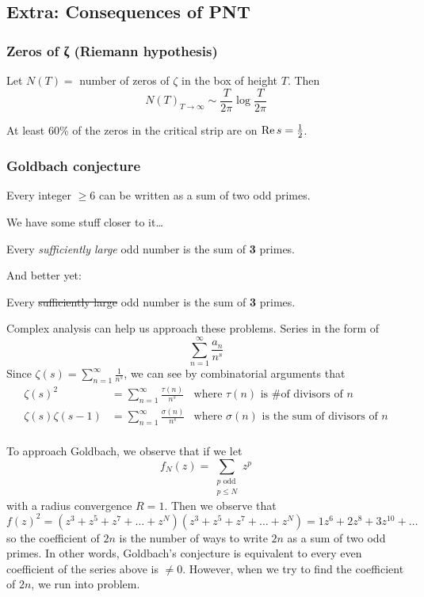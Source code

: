 \documentclass[12pt]{article}
\begin{document}
\subsection{Extra: Consequences of PNT}
\subsubsection{Zeros of ζ (Riemann hypothesis)}
\begin{theorem}
    Let $N(T) = $ number of zeros of $\zeta$ in the box of height $T$. Then \[N(T)_{T\to \infty}\sim \frac{T}{2\pi}\log \frac{T}{2\pi}\]
\end{theorem}
\rmk[Lagaria's] At least 60\% of the zeros in the critical strip are on $\operatorname{Re} s=\frac{1}{2}$. 

\subsubsection{Goldbach conjecture}
\conjecture[Goldbach] Every integer $\geq 6$ can be written as a sum of two odd primes.

We have some stuff closer to it\dots
\begin{theorem}[Vinogradov's]
    Every \textit{sufficiently large} odd number is the sum of \textbf{3} primes.
\end{theorem}
And better yet:
\begin{theorem}[H. Helfgott]
    Every \sout{sufficiently large} odd number is the sum of \textbf{3} primes.
\end{theorem}
Complex analysis can help us approach these problems. 
 Series in the form of \[\sum_{n=1}^{\infty} \frac{a_n}{n^s}\]
Since $\zeta(s)=\sum_{n=1}^{\infty}\frac{1}{n^s}$, we can see by combinatorial arguments that \begin{align*}
    \zeta(s)^2 &= \sum_{n=1}^{\infty}\frac{\tau(n)}{n^s}&\text{where $\tau(n)$ is \# of divisors of }n\\
    \zeta(s)\zeta(s-1)&= \sum_{n=1}^{\infty}\frac{\sigma(n)}{n^s}&\text{where $\sigma(n)$ is the sum of divisors of }n\\
\end{align*}

To approach Goldbach, we observe that if we let \[f_N(z)= \sum_{\substack{p \text{ odd}\\ p\leq N}}z^{p}\]
with a radius convergence $R=1$. Then we observe that \[f(z)^2= (z^3+z^5+z^7+\dots + z^N)(z^3+z^5+z^7+\dots + z^N) = 1z^6+2z^8+3z^{10}+\dots\]
so the coefficient of $2n$ is the number of ways to write $2n$ as a sum of two odd primes. In other words, Goldbach's conjecture is equivalent to every even coefficient of the series above is $\neq 0$. However, when we try to find the coefficient of $2n$, we run into problem. 
\end{document}
